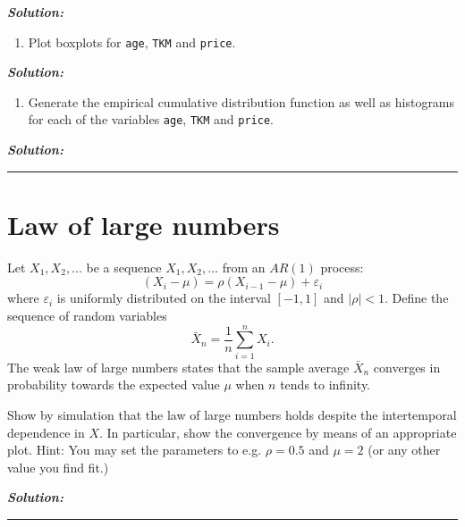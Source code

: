 \documentclass[]{article}
\providecommand{\tightlist}{%
  \setlength{\itemsep}{0pt}\setlength{\parskip}{0pt}}
\begin{document}
\textbf{\emph{Solution:}}

\begin{enumerate}
\def\labelenumi{\arabic{enumi}.}
\setcounter{enumi}{1}
\tightlist
\item
  Plot boxplots for \texttt{age}, \texttt{TKM} and \texttt{price}.
\end{enumerate}

\textbf{\emph{Solution:}}

\begin{enumerate}
\def\labelenumi{\arabic{enumi}.}
\setcounter{enumi}{2}
\tightlist
\item
  Generate the empirical cumulative distribution function as well as
  histograms for each of the variables \texttt{age}, \texttt{TKM} and
  \texttt{price}.
\end{enumerate}

\textbf{\emph{Solution:}}

\pagebreak

\begin{center}\rule{0.5\linewidth}{\linethickness}\end{center}

\section{Law of large numbers}\label{law-of-large-numbers}

Let \(X_1, X_2,...\) be a sequence \(X_1,X_2,...\) from an \(AR(1)\)
process: \[
\left( X_{i}-\mu \right) =\rho \left( X_{i-1}-\mu \right) +\varepsilon _{i}
\] where \(\varepsilon _{i}\) is uniformly distributed on the interval
\([-1,1]\) and \(|\rho |<1\). Define the sequence of random variables \[
\bar{X}_{n}=\frac{1}{n}\sum_{i=1}^{n}X_{i}.
\] The weak law of large numbers states that the sample average
\(\bar{X}_{n}\) converges in probability towards the expected value
\(\mu\) when \(n\) tends to infinity.

Show by simulation that the law of large numbers holds despite the
intertemporal dependence in \(X\). In particular, show the convergence
by means of an appropriate plot. Hint: You may set the parameters to
e.g. \(\rho=0.5\) and \(\mu=2\) (or any other value you find fit.)

\textbf{\emph{Solution:}}

\pagebreak

\begin{center}\rule{0.5\linewidth}{\linethickness}\end{center}
\end{document}
